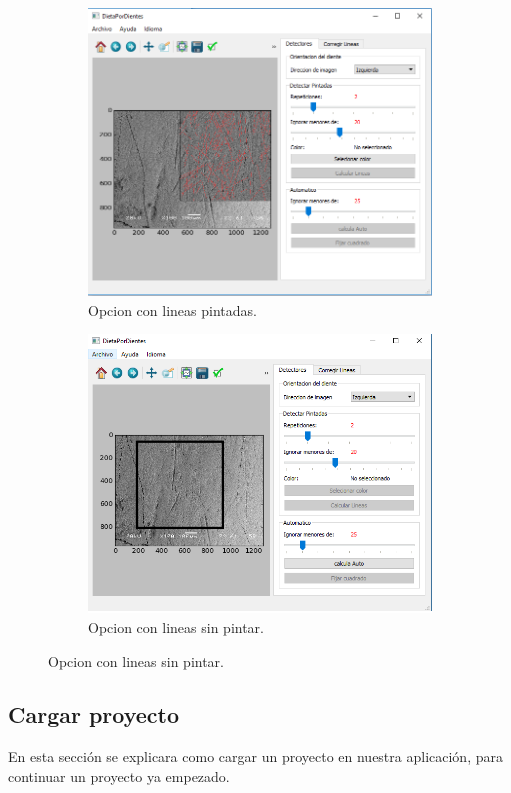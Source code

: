 \documentclass[13pt]{book}              %
\begin{document}
{\begin{figure}
	\begin{subfigure}[c]{.5\linewidth}
	\centering\large \includegraphics[width=.9\textwidth]{opcion1}
	\caption{Opcion con lineas pintadas.}\label{fig:opcion1}
	\end{subfigure}%
	\begin{subfigure}[c]{.5\linewidth}
	\centering\large \includegraphics[width=.9\textwidth]{opcion2}
	\caption{Opcion con lineas sin pintar.}\label{fig:opcion2}
	\end{subfigure}%
\end{figure}




\label{modo:2}
\subsection{Cargar proyecto}
En esta sección se explicara como cargar un proyecto en nuestra aplicación, para continuar un proyecto ya empezado.

}
\end{document}
